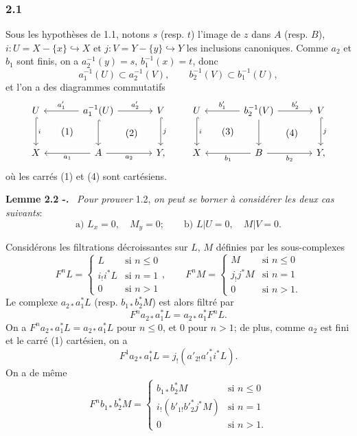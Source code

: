 \documentclass[11pt]{article}
\newenvironment{statement}[1]{\par\medskip\noindent\textbf{#1.}\ }{\par\medskip}
\begin{document}
\subsubsection*{2.1}
Sous les hypothèses de 1.1, notons $s$ (resp. $t$) l'image de $z$ dans $A$ (resp. $B$), $i:U=X-\{x\}\hookrightarrow X$ et $j:V=Y-\{y\}\hookrightarrow Y$ les inclusions canoniques. Comme $a_2$ et $b_1$ sont finis, on a $a_2^{-1}(y)=s$, $b_1^{-1}(x)=t$, donc
\[
a_1^{-1}(U)\subset a_2^{-1}(V),\qquad b_2^{-1}(V)\subset b_1^{-1}(U),
\]
et l'on a des diagrammes commutatifs
\[
\begin{tikzcd}[column sep=large,row sep=large]
U \arrow[d,hook,"i"] \arrow[rd,phantom,"(1)"{description}] & a_1^{-1}(U) \arrow[l,"a'_1"'] \arrow[r,"a'_2"] \arrow[d,hook] \arrow[rd,phantom,"(2)"{description}] & V \arrow[d,hook,"j"]\\
X & A \arrow[l,"a_1"] \arrow[r,"a_2"'] & Y ,
\end{tikzcd}
\qquad
\begin{tikzcd}[column sep=large,row sep=large]
U \arrow[d,hook,"i"] \arrow[rd,phantom,"(3)"{description}] & b_2^{-1}(V) \arrow[l,"b'_1"'] \arrow[r,"b'_2"] \arrow[d] \arrow[rd,phantom,"(4)"{description}] & V \arrow[d,hook,"j"]\\
X & B \arrow[l,"b_1"] \arrow[r,"b_2"'] & Y ,
\end{tikzcd}
\]
où les carrés (1) et (4) sont cartésiens.

\begin{statement}{Lemme 2.2 -}
\emph{Pour prouver} 1.2, \emph{on peut se borner à considérer les deux cas suivants}:
\[
\text{a) } L_x=0,\quad M_y=0;\qquad
\text{b) } L|U=0,\quad M|V=0 .
\]
\end{statement}

Considérons les filtrations décroissantes sur $L$, $M$ définies par les sous-complexes
\[
F^nL=
\begin{cases}
L & \text{si } n\le 0\\
i_!i^*L & \text{si } n=1\\
0 & \text{si } n>1
\end{cases}
,\qquad
F^nM=
\begin{cases}
M & \text{si } n\le 0\\
j_!j^*M & \text{si } n=1\\
0 & \text{si } n>1.
\end{cases}
\]
Le complexe $a_{2*}a_1^*L$ (resp. $b_{1*}b_2^*M$) est alors filtré par
\[
F^n a_{2*}a_1^*L=a_{2*}a_1^*F^nL.
\]
On a $F^n a_{2*}a_1^*L=a_{2*}a_1^*L$ pour $n\le 0$, et $0$ pour $n>1$; de plus, comme $a_2$ est fini et le carré (1) cartésien, on a
\[
F^1a_{2*}a_1^*L=j_!(a'_{2!}a'^*_1i^*L).
\]
On a de même
\[
F^n b_{1*}b_2^*M=
\begin{cases}
b_{1*}b_2^*M & \text{si } n\le 0\\
i_!(b'_{1!}b'^*_2j^*M) & \text{si } n=1\\
0 & \text{si } n>1.
\end{cases}
\]
\end{document}
